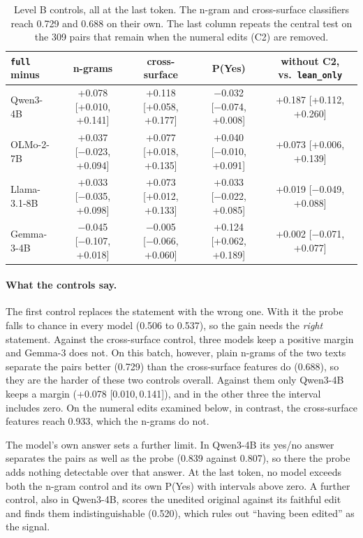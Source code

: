\documentclass[10pt]{article}
\newcommand{\vr}[1]{\texttt{#1}}
\newcommand{\ic}[2]{[#1,\,#2]}
\begin{document}
\begin{table}[h]
\centering
\caption{Level B controls, all at the last token. The n-gram and cross-surface classifiers reach 0.729 and 0.688 on their own. The last column repeats the central test on the 309 pairs that remain when the numeral
edits (C2) are removed.}
\label{tab:bcontroles}
\vspace{2pt}
{\footnotesize\setlength{\tabcolsep}{3pt}
\begin{tabular}{@{}lcccc@{}}
\toprule
\vr{full} minus & n-grams & cross-surface & P(Yes) & without C2, vs.\ \vr{lean\_only}\\
\midrule
Qwen3-4B     & +0.078 [+0.010, +0.141] & +0.118 [+0.058, +0.177] & −0.032 [−0.074, +0.008] & +0.187 [+0.112, +0.260]\\
OLMo-2-7B    & +0.037 [−0.023, +0.094] & +0.077 [+0.018, +0.135] & +0.040 [−0.010, +0.091] & +0.073 [+0.006, +0.139]\\
Llama-3.1-8B & +0.033 [−0.035, +0.098] & +0.073 [+0.012, +0.133] & +0.033 [−0.022, +0.085] & +0.019 [−0.049, +0.088]\\
Gemma-3-4B   & −0.045 [−0.107, +0.018] & −0.005 [−0.066, +0.060] & +0.124 [+0.062, +0.189] & +0.002 [−0.071, +0.077]\\
\bottomrule
\end{tabular}}
\end{table}

\paragraph{What the controls say.}
The first control replaces the statement with the wrong one. With it the probe falls to chance in every model
(0.506 to 0.537), so the gain needs the \emph{right} statement. Against the cross-surface control, three models
keep a positive margin and Gemma-3 does not. On this batch, however, plain n-grams of the two
texts separate the pairs better (0.729) than the cross-surface features do (0.688), so they are the harder of these two controls
overall. Against them only Qwen3-4B keeps a margin (+0.078 \ic{0.010}{0.141}), and in the other three the interval
includes zero. On the numeral edits examined below, in contrast, the cross-surface features reach 0.933, which the
n-grams do not.

The model's own answer sets a further limit. In Qwen3-4B its yes/no answer separates the pairs as well as the probe
(0.839 against 0.807), so there the probe adds nothing detectable over that answer. At the last token, no model
exceeds both the n-gram control and its own P(Yes) with intervals above zero. A further control, also in Qwen3-4B,
scores the unedited original against its faithful edit and finds them indistinguishable (0.520), which rules out
``having been edited'' as the signal.
\end{document}
